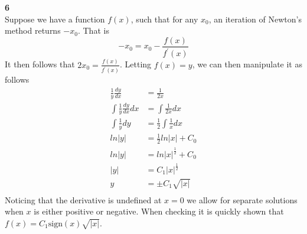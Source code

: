 \documentclass[12pt]{article}
\newcommand{\problem}[1]{\hspace{-4 ex} \large \textbf{#1}\\}
\begin{document}
	
\problem{6} 
	Suppose we have a function $f(x)$, such that for any $x_0$, an iteration of Newton's method returns $-x_0$. That is 
	$$
	-x_0 = x_0 - \frac{f(x)}{f^\prime(x)}
	$$
	It then follows that $2x_0 = \frac{f(x)}{f^\prime(x)}$. Letting $f(x)=y$, we can then manipulate it as follows
	\begin{align*}
		\frac{1}{y}\frac{dy}{dx} & = \frac{1}{2x} \\
		\int \frac{1}{y}\frac{dy}{dx} dx & = \int \frac{1}{2x} dx \\
		\int \frac{1}{y}dy & = \frac{1}{2}\int \frac{1}{x} dx \\
		ln\vert y \vert & = \frac{1}{2} ln\vert x \vert + C_0 \\
		ln\vert y \vert & = ln\vert x \vert^\frac{1}{2} + C_0 \\
		\vert y \vert & = C_1 \vert x \vert^\frac{1}{2} \\
		y & = \pm C_1 \sqrt{\vert x \vert} \\
	\end{align*}
	Noticing that the derivative is undefined at $x=0$ we allow for separate solutions when $x$ is either positive or negative. When checking it is quickly shown that $f(x)=C_1 \text{sign}(x)\sqrt{\vert x \vert}$.
\end{document}
